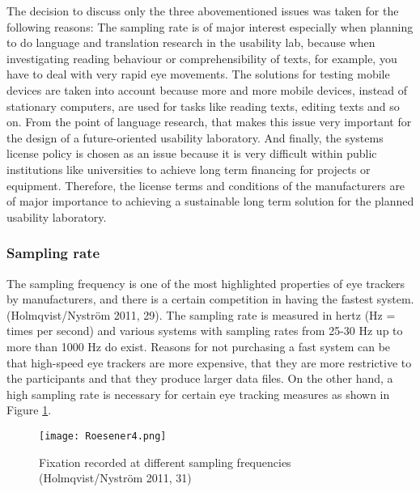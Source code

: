 \begin{
}[h]
\begin{styleBodyTextIndent}
The decision to discuss only the three abovementioned issues was taken for the following reasons: The sampling rate is of major interest especially when planning to do language and translation research in the usability lab, because when investigating reading behaviour or comprehensibility of texts, for example, you have to deal with very rapid eye movements. The solutions for testing mobile devices are taken into account because more and more mobile devices, instead of stationary computers, are used for tasks like reading texts, editing texts and so on. From the point of language research, that makes this issue very important for the design of a future-oriented usability laboratory. And finally, the systems license policy is chosen as an issue because it is very difficult within public institutions like universities to achieve long term financing for projects or equipment. Therefore, the license terms and conditions of the manufacturers are of major importance to achieving a sustainable long term solution for the planned usability laboratory.
\end{styleBodyTextIndent}

\subsubsection{Sampling rate}

{\textquotedbl}The sampling frequency is one of the most highlighted properties of eye trackers by manufacturers, and there is a certain competition in having the fastest system.{\textquotedbl} (Holmqvist/Nyström 2011, 29). The sampling rate is measured in hertz (Hz = times per second) and various systems with sampling rates from 25-30 Hz up to more than 1000 Hz do exist. Reasons for not purchasing a fast system can be that high-speed eye trackers are more expensive, that they are more restrictive to the participants and that they produce larger data files. On the other hand, a high sampling rate is necessary for certain eye tracking measures as shown in Figure \ref{fig:4}.

\begin{figure}[h]
 \texttt{[image: Roesener4.png]}
 \caption{Fixation recorded at different sampling frequencies (Holmqvist/Nyström 2011, 31)}
 \label{fig:4}
\end{figure} 



\end{
}
